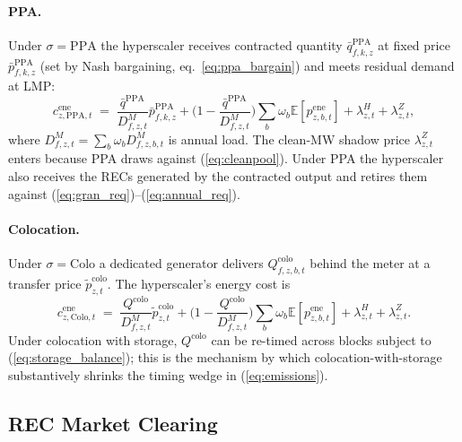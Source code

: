\documentclass[12pt,letterpaper]{article}
\begin{document}
\paragraph{PPA.} Under $\sigma = \text{PPA}$ the hyperscaler receives
contracted quantity $\bar q^{\text{PPA}}_{f,k,z}$ at fixed price
$\bar p^{\text{PPA}}_{f,k,z}$ (set by Nash bargaining,
eq.~\ref{eq:ppa_bargain}) and meets residual demand at LMP:
\begin{equation}
\label{eq:c_ppa}
c^{\mathrm{ene}}_{z,\text{PPA},t} \;=\;
\frac{\bar q^{\text{PPA}}}{D^M_{f,z,t}} \bar p^{\text{PPA}}_{f,k,z}
+ \Big(1 - \frac{\bar q^{\text{PPA}}}{D^M_{f,z,t}}\Big) \sum_b \omega_b
\mathbb{E}[p^{\text{ene}}_{z,b,t}] + \lambda^H_{z,t} + \lambda^Z_{z,t},
\end{equation}
where $D^M_{f,z,t} = \sum_b \omega_b D^M_{f,z,b,t}$ is annual load. The
clean-MW shadow price $\lambda^Z_{z,t}$ enters because PPA draws against
(\ref{eq:cleanpool}). Under PPA the hyperscaler also receives the RECs
generated by the contracted output and retires them against
(\ref{eq:gran_req})--(\ref{eq:annual_req}).

\paragraph{Colocation.} Under $\sigma = \text{Colo}$ a dedicated generator
delivers $Q^{\text{colo}}_{f,z,b,t}$ behind the meter at a transfer price
$\tilde p^{\text{colo}}_{z,t}$. The hyperscaler's energy cost is
\begin{equation}
\label{eq:c_colo}
c^{\mathrm{ene}}_{z,\text{Colo},t} \;=\;
\frac{Q^{\text{colo}}}{D^M_{f,z,t}} \tilde p^{\text{colo}}_{z,t}
+ \Big(1 - \frac{Q^{\text{colo}}}{D^M_{f,z,t}}\Big) \sum_b \omega_b
\mathbb{E}[p^{\text{ene}}_{z,b,t}] + \lambda^H_{z,t} + \lambda^Z_{z,t}.
\end{equation}
Under colocation with storage, $Q^{\text{colo}}$ can be re-timed across
blocks subject to (\ref{eq:storage_balance}); this is the mechanism by
which colocation-with-storage substantively shrinks the timing wedge in
(\ref{eq:emissions}).

\subsection{REC Market Clearing}
\label{sec:rec_market}
\end{document}
